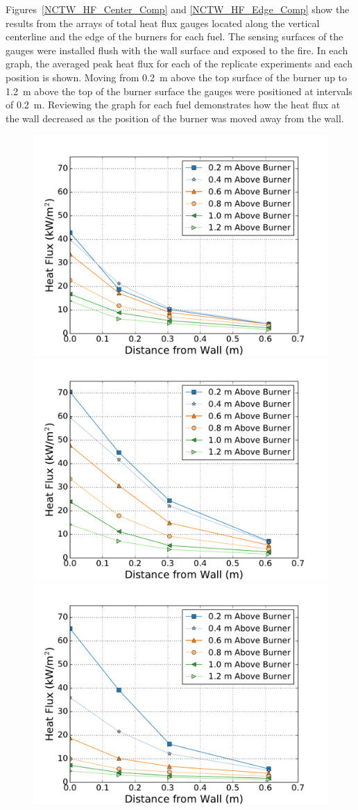 \documentclass[twoside]{uocthesis}
\begin{document}
{Figures~\ref{NCTW_HF_Center_Comp} and \ref{NCTW_HF_Edge_Comp} show the results from the arrays of total heat flux gauges located along the vertical centerline and the edge of the burners for each fuel.  The sensing surfaces of the gauges were installed flush with the wall surface and exposed to the fire. In each graph, the averaged peak heat flux for each of the replicate experiments and each position is shown.  Moving from 0.2~m above the top surface of the burner up to 1.2~m above the top of the burner surface the gauges were positioned at intervals of 0.2~m.  Reviewing the graph for each fuel demonstrates how the heat flux at the wall decreased as the position of the burner was moved away from the wall.  

\begin{figure}[p]
	\centering
	\includegraphics[width=.6\columnwidth]{../Figures/NCTW_NG_HF_Center_Avg} \\
	\includegraphics[width=.6\columnwidth]{../Figures/NCTW_GAS_HF_Center_Avg}\\
	\includegraphics[width=.6\columnwidth]{../Figures/NCTW_PUF_HF_Center_Avg} \\

\end{figure}}
\end{document}
